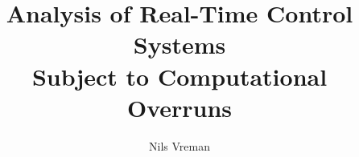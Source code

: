 \begin{titlepages}
    \author{Nils Vreman}
    \title{Analysis of Real-Time Control Systems \\Subject to Computational Overruns}
    \dedication{Dedicated to\dots}        %
\end{titlepages}
